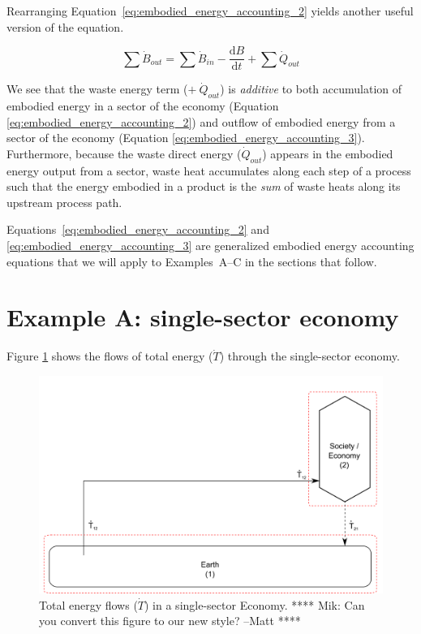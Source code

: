 Rearranging Equation~\ref{eq:embodied_energy_accounting_2}
yields another useful version of the equation.

\begin{equation} \label{eq:embodied_energy_accounting_3}
	\sum \dot{B}_{out}
	= \sum \dot{B}_{in}
	- \frac{\mathrm{d}B}{\mathrm{d}t} 
	+ \sum \dot{Q}_{out}
\end{equation}

We see that the waste energy term ($+\ \dot{Q}_{out}$) 
is \emph{additive} to both accumulation 
of embodied energy in a sector of the economy
(Equation \ref{eq:embodied_energy_accounting_2}) and 
outflow of embodied energy from a sector of the economy 
(Equation \ref{eq:embodied_energy_accounting_3}). 
Furthermore, because the waste direct energy 
($\dot{Q}_{out}$) appears 
in the embodied energy output from a sector, 
waste heat accumulates along each step of a process 
such that the energy embodied in a product 
is the \emph{sum} of waste heats along 
its upstream process path.

Equations~\ref{eq:embodied_energy_accounting_2}
and \ref{eq:embodied_energy_accounting_3} are generalized
embodied energy accounting equations that we will
apply to Examples~A--C in the sections that follow.


\section{Example A: single-sector economy}

Figure \ref{fig:A_total_energy} shows the flows of total energy ($\dot{T}$) through the single-sector economy.

\begin{figure}[h!]
\includegraphics[width=1.0\linewidth]{Part_2/Chapter_Embodied/images/I-O_one_sector_total_energy.pdf}
\caption{Total energy flows ($\dot{T}$) in a single-sector Economy. 
**** Mik: Can you convert this figure to our new style? --Matt ****}
\label{fig:A_total_energy}
\end{figure}

